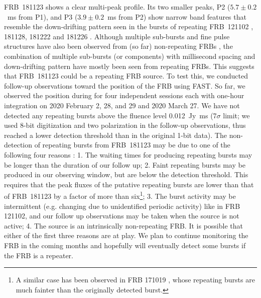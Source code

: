 FRB~181123 shows a clear multi-peak profile. Its two smaller peaks, P2 ($5.7\pm0.2$~ms from P1), and P3 ($3.9\pm0.2$~ms from P2) show narrow band features that resemble the down-drifting pattern seen in the bursts of repeating FRB~121102 \citep{gsp+18,hessels19}, 181128, 181222 and 181226 \citep{chime_8}. 
Although multiple sub-bursts and fine pulse structures have also been observed from (so far) non-repeating FRBs \citep{cpk+16,ffb+18,cms+20}, the combination of multiple sub-bursts (or components) with millisecond spacing
and down-drifting pattern have mostly been seen from repeating FRBs. This suggests that FRB~181123 could be a repeating FRB source. To test this, we conducted follow-up observations toward the position of the FRB using FAST. So far, we observed the position during for four independent sessions each with one-hour integration on 2020 February 2, 28, and 29 and 2020 March 27. We have not detected any repeating bursts above the fluence level 0.012~Jy~ms (7$\sigma$ limit; we used 8-bit digitization and two polarization in the follow-up observations, thus reached a lower detection threshold than in the original 1-bit data).  
The non-detection of repeating bursts from FRB~181123 may be due to one of the following four reasons \citep[e.g.][]{palaniswamy18}: 1. The waiting times for producing repeating bursts may be longer than the duration of our follow up; 2. Faint repeating bursts may be produced in our observing window, but are below the detection threshold. This requires that the peak fluxes of the putative repeating bursts are lower than that of FRB~181123 by a factor of more than six\footnote{A similar case has been observed in FRB 171019 \citep{kumar19}, whose repeating bursts are much fainter than the originally detected burst.}; 3. The burst activity may be intermittent (e.g. changing due to unidentified periodic activity) like in FRB 121102, and our follow up observations may be taken when the source is not active; 4. The source is an intrinsically non-repeating FRB. It is possible that either of the first three reasons are at play. We plan to continue monitoring the FRB in the coming months and hopefully will eventually detect some bursts if the FRB is a repeater.



